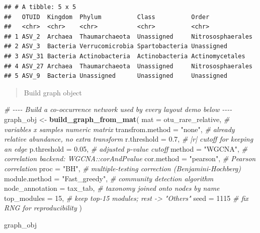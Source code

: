 \documentclass[
]{book}
\newenvironment{Shaded}{\begin{snugshade}}{\end{snugshade}}
\newcommand{\AttributeTok}[1]{\textcolor[rgb]{0.13,0.29,0.53}{#1}}
\newcommand{\CommentTok}[1]{\textcolor[rgb]{0.56,0.35,0.01}{\textit{#1}}}
\newcommand{\DecValTok}[1]{\textcolor[rgb]{0.00,0.00,0.81}{#1}}
\newcommand{\FloatTok}[1]{\textcolor[rgb]{0.00,0.00,0.81}{#1}}
\newcommand{\FunctionTok}[1]{\textcolor[rgb]{0.13,0.29,0.53}{\textbf{#1}}}
\newcommand{\NormalTok}[1]{#1}
\newcommand{\OtherTok}[1]{\textcolor[rgb]{0.56,0.35,0.01}{#1}}
\newcommand{\StringTok}[1]{\textcolor[rgb]{0.31,0.60,0.02}{#1}}
\begin{document}
\begin{verbatim}
## # A tibble: 5 x 5
##   OTUID  Kingdom  Phylum          Class          Order            
##   <chr>  <chr>    <chr>           <chr>          <chr>            
## 1 ASV_2  Archaea  Thaumarchaeota  Unassigned     Nitrososphaerales
## 2 ASV_3  Bacteria Verrucomicrobia Spartobacteria Unassigned       
## 3 ASV_31 Bacteria Actinobacteria  Actinobacteria Actinomycetales  
## 4 ASV_27 Archaea  Thaumarchaeota  Unassigned     Nitrososphaerales
## 5 ASV_9  Bacteria Unassigned      Unassigned     Unassigned
\end{verbatim}

\begin{quote}
Build graph object
\end{quote}

\begin{Shaded}
\begin{Highlighting}[]
\CommentTok{\# {-}{-}{-}{-} Build a co{-}occurrence network used by every layout demo below {-}{-}{-}{-}}
\NormalTok{graph\_obj }\OtherTok{\textless{}{-}} \FunctionTok{build\_graph\_from\_mat}\NormalTok{(}
  \AttributeTok{mat              =}\NormalTok{ otu\_rare\_relative,  }\CommentTok{\# variables x samples numeric matrix}
  \AttributeTok{transfrom.method =} \StringTok{"none"}\NormalTok{,             }\CommentTok{\# already relative abundance, no extra transform}
  \AttributeTok{r.threshold      =} \FloatTok{0.7}\NormalTok{,                }\CommentTok{\# |r| cutoff for keeping an edge}
  \AttributeTok{p.threshold      =} \FloatTok{0.05}\NormalTok{,               }\CommentTok{\# adjusted p{-}value cutoff}
  \AttributeTok{method           =} \StringTok{"WGCNA"}\NormalTok{,            }\CommentTok{\# correlation backend: WGCNA::corAndPvalue}
  \AttributeTok{cor.method       =} \StringTok{"pearson"}\NormalTok{,          }\CommentTok{\# Pearson correlation}
  \AttributeTok{proc             =} \StringTok{"BH"}\NormalTok{,               }\CommentTok{\# multiple{-}testing correction (Benjamini{-}Hochberg)}
  \AttributeTok{module.method    =} \StringTok{"Fast\_greedy"}\NormalTok{,      }\CommentTok{\# community detection algorithm}
  \AttributeTok{node\_annotation  =}\NormalTok{ tax\_tab,            }\CommentTok{\# taxonomy joined onto nodes by name}
  \AttributeTok{top\_modules      =} \DecValTok{15}\NormalTok{,                 }\CommentTok{\# keep top{-}15 modules; rest {-}\textgreater{} "Others"}
  \AttributeTok{seed             =} \DecValTok{1115}                \CommentTok{\# fix RNG for reproducibility}
\NormalTok{)}

\NormalTok{graph\_obj}
\end{Highlighting}
\end{Shaded}
\end{document}
